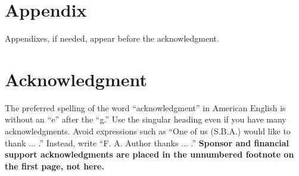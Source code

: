 \documentclass[transmag, onecolumn]{IEEEtran}
\begin{document}
\section*{Appendix}

Appendixes, if needed, appear before the acknowledgment.

\section*{Acknowledgment}

The preferred spelling of the word ``acknowledgment'' in American English is 
without an ``e'' after the ``g.'' Use the singular heading even if you have 
many acknowledgments. Avoid expressions such as ``One of us (S.B.A.) would 
like to thank $\ldots$ .'' Instead, write ``F. A. Author thanks $\ldots$ .'' 
\textbf{Sponsor and financial support acknowledgments are placed in the 
unnumbered footnote on the first page, not here.}
\end{document}
